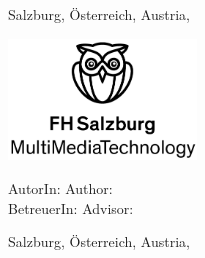 \begin{titlepage}
{    \vfill
    
    Salzburg, \ifmmtlanguagegerman Österreich, \else Austria, \fi  \thesisdate
    }

\else %

    \begin{center}
    
    \includegraphics[width=5cm]{images/FHSLogo.jpg}


    \vspace*{4cm}
    
    \fontsize{20.79}{18pt}{\selectfont        
    	\textit{\textbf{\titlename}}
    }
    
    \vspace*{4cm}
    
    \fontsize{20.79}{18pt}{%
    \ifmmtlanguagegerman
    	\textbf{Bachelorarbeit \ifmmtpaper 1 \else 2 \fi }
    \else
        \textbf{Bachelor Thesis \ifmmtpaper 1 \else 2 \fi }
    \fi
    }
    
    
    \end{center}
    
    \vfill
    
    \ifmmtlanguagegerman AutorIn: \else Author: \fi  \authorname  \\
    \ifmmtlanguagegerman BetreuerIn: \else Advisor: \fi \advisor \\
    
    Salzburg, \ifmmtlanguagegerman Österreich, \else Austria, \fi \thesisdate
    
    
    

\fi

\end{titlepage}
